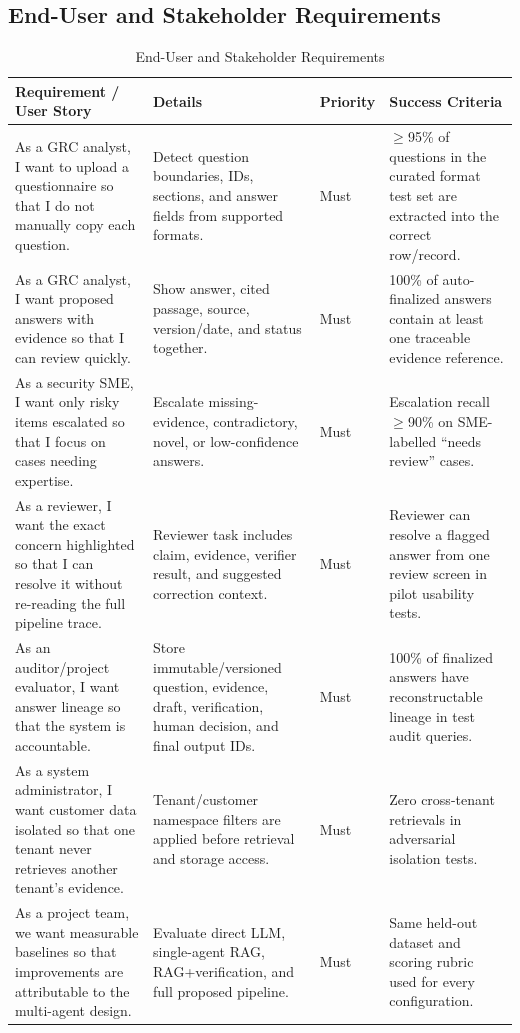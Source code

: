 \documentclass[11pt,journal,onecolumn]{IEEEtran}
\begin{document}
\subsection{End-User and Stakeholder Requirements}
\begin{table}[H]
\centering
\caption{End-User and Stakeholder Requirements}
\small
\begin{tabularx}{\textwidth}{L{0.29\textwidth}Y L{0.10\textwidth} Y}
\toprule
\textbf{Requirement / User Story} & \textbf{Details} & \textbf{Priority} & \textbf{Success Criteria} \\
\midrule
As a GRC analyst, I want to upload a questionnaire so that I do not manually copy each question. & Detect question boundaries, IDs, sections, and answer fields from supported formats. & Must & $\geq$95\% of questions in the curated format test set are extracted into the correct row/record. \\
As a GRC analyst, I want proposed answers with evidence so that I can review quickly. & Show answer, cited passage, source, version/date, and status together. & Must & 100\% of auto-finalized answers contain at least one traceable evidence reference. \\
As a security SME, I want only risky items escalated so that I focus on cases needing expertise. & Escalate missing-evidence, contradictory, novel, or low-confidence answers. & Must & Escalation recall $\geq$90\% on SME-labelled ``needs review'' cases. \\
As a reviewer, I want the exact concern highlighted so that I can resolve it without re-reading the full pipeline trace. & Reviewer task includes claim, evidence, verifier result, and suggested correction context. & Must & Reviewer can resolve a flagged answer from one review screen in pilot usability tests. \\
As an auditor/project evaluator, I want answer lineage so that the system is accountable. & Store immutable/versioned question, evidence, draft, verification, human decision, and final output IDs. & Must & 100\% of finalized answers have reconstructable lineage in test audit queries. \\
As a system administrator, I want customer data isolated so that one tenant never retrieves another tenant's evidence. & Tenant/customer namespace filters are applied before retrieval and storage access. & Must & Zero cross-tenant retrievals in adversarial isolation tests. \\
As a project team, we want measurable baselines so that improvements are attributable to the multi-agent design. & Evaluate direct LLM, single-agent RAG, RAG+verification, and full proposed pipeline. & Must & Same held-out dataset and scoring rubric used for every configuration. \\
\bottomrule
\end{tabularx}
\end{table}
\end{document}
